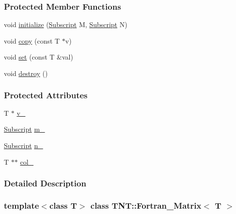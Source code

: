 \subsubsection*{Protected Member Functions}
\begin{DoxyCompactItemize}
\item 
void \hyperlink{class_t_n_t_1_1_fortran___matrix_a18e22628cc322551831525841b42f0a5}{initialize} (\hyperlink{namespace_t_n_t_af22e3f1460e145c04ce4e7d701e4c1c1}{Subscript} M, \hyperlink{namespace_t_n_t_af22e3f1460e145c04ce4e7d701e4c1c1}{Subscript} N)
\item 
void \hyperlink{class_t_n_t_1_1_fortran___matrix_ad90b29a403d2122135e10d76521a5b1b}{copy} (const T $\ast$v)
\item 
void \hyperlink{class_t_n_t_1_1_fortran___matrix_a38f39aadff3947e8a87592c0b8edfe73}{set} (const T \&val)
\item 
void \hyperlink{class_t_n_t_1_1_fortran___matrix_ae69b3e2070b38804e3f62cdcefd8c275}{destroy} ()
\end{DoxyCompactItemize}
\subsubsection*{Protected Attributes}
\begin{DoxyCompactItemize}
\item 
T $\ast$ \hyperlink{class_t_n_t_1_1_fortran___matrix_abf3d2e67457caba42916d0a3ad6020c7}{v\_\-}
\item 
\hyperlink{namespace_t_n_t_af22e3f1460e145c04ce4e7d701e4c1c1}{Subscript} \hyperlink{class_t_n_t_1_1_fortran___matrix_a46cf332ea8ddc7772f810e07e562cce4}{m\_\-}
\item 
\hyperlink{namespace_t_n_t_af22e3f1460e145c04ce4e7d701e4c1c1}{Subscript} \hyperlink{class_t_n_t_1_1_fortran___matrix_ad5c8562413e6a438274c565a9b6fafc2}{n\_\-}
\item 
T $\ast$$\ast$ \hyperlink{class_t_n_t_1_1_fortran___matrix_a3c6be5332f47815486e31b62910e0ab1}{col\_\-}
\end{DoxyCompactItemize}


\subsubsection{Detailed Description}
\subsubsection*{template$<$class T$>$ class TNT::Fortran\_\-Matrix$<$ T $>$}



